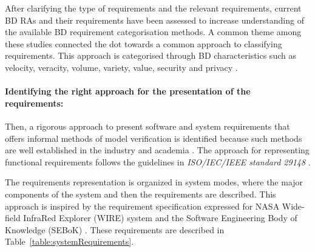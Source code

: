 \documentclass[preprint,12pt]{elsarticle}
\begin{document}
After clarifying the type of requirements and the relevant requirements, current BD RAs and their requirements have been assessed to increase understanding of the available BD requirement categorisation methods. A common theme among these studies connected the dot towards a common approach to classifying requirements. This approach is categorised through BD characteristics such as velocity, veracity, volume, variety, value, security and privacy \cite{ataei2022state, Bahrami2015,rad2017big,Chen2016a}.

\paragraph{Identifying the right approach for the presentation of the requirements:}

Then, a rigorous approach to present software and system requirements that offers informal methods of model verification is identified because such methods are well established in the industry and academia \cite{kassab2014state}. The approach for representing functional requirements follows the guidelines in \emph{ISO/IEC/IEEE standard 29148} \cite{ISO29148}. 

The requirements representation is organized in system modes, where the major components of the system and then the requirements are described. This approach is inspired by the requirement specification expressed for NASA Wide-field InfraRed Explorer (WIRE) system \cite{laplante2017requirements} and the Software Engineering Body of Knowledge (SEBoK) \cite{abran2004software}. These requirements are described in Table~\ref{table:systemRequirements}.
\end{document}
